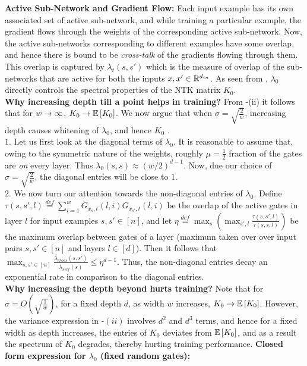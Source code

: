 \textbf{Active Sub-Network and Gradient Flow:}  Each input example has its own associated set of active sub-network, and while training a particular example, the gradient flows through the weights of the corresponding active sub-network. Now, the active sub-networks corresponding to different examples have some overlap, and hence there is bound to be \emph{cross-talk} of the gradients flowing through them. This overlap is captured by $\lambda_t(s,s')$ which is the measure of overlap of the sub-networks that are active for both the inputs $x,x'\in\mathbb{R}^{d_{in}}$. As seen from , $\lambda_0$ directly controls the spectral properties of the NTK matrix $K_0$.\\
\textbf{Why increasing depth till a point helps in training? } From -(ii) it follows that for $w\rightarrow\infty$, $K_0\rightarrow\mathbb{E}\left[K_0\right]$. We now argue that when $\sigma=\sqrt{\frac{2}{w}}$, increasing depth causes whitening of $\lambda_0$, and hence $K_0$ .\hfill\\
$1.$ Let us first look at the diagonal terms of $\lambda_0$. It is reasonable to assume that, owing to the symmetric nature of the weights, roughly $\mu=\frac{1}{2}$ fraction of the gates are \emph{on} every layer. Thus $\lambda_0(s,s)\approx (w/2)^{d-1}$. Now, due our choice of $\sigma=\sqrt{\frac{2}{w}}$, the diagonal entries will be close to $1$.\hfill\\
$2.$ We now turn our attention towards the non-diagonal entries of $\lambda_0$. Define $\tau(s,s',l)\stackrel{def}=\sum_{i=1}^w G_{x_s,t}(l,i)G_{x_{s'},t}(l,i)$ be the overlap of the active gates in layer $l$ for input examples $s,s'\in[n]$, and  let $\eta\stackrel{def}=\max_s\left(\max_{s',l} \frac{\tau(s,s',l)}{\tau(s,s,l)}\right)$ be the maximum overlap between gates of a layer (maximum taken over over input pairs $s,s'\in[n]$ and layers $l\in [d]$).  Then it follows that $\max_{s,s'\in [n]} \frac{\bar{\lambda}_{cross}(s,s')}{\bar{\lambda}_{self}(s)}\leq \eta^{d-1}$. Thus, the non-diagonal entries decay an exponential rate in comparison to the diagonal entries.\hfill\\
\textbf{Why increasing the depth beyond hurts training?} Note that for $\sigma=O\left(\sqrt{\frac{1}{w}}\right)$, for a fixed depth $d$, as width $w$ increases, $K_0\rightarrow\mathbb{E}\left[K_0\right]$. However, the variance expression in -$(ii)$ involves $d^2$ and $d^3$ terms, and hence for a fixed width as depth increases, the entries of $K_0$ deviates from $\mathbb{E}\left[K_0\right]$, and as a result the spectrum of $K_0$ degrades, thereby hurting training performance.
\textbf{Closed form expression for $\lambda_0$ (fixed random gates):} 
